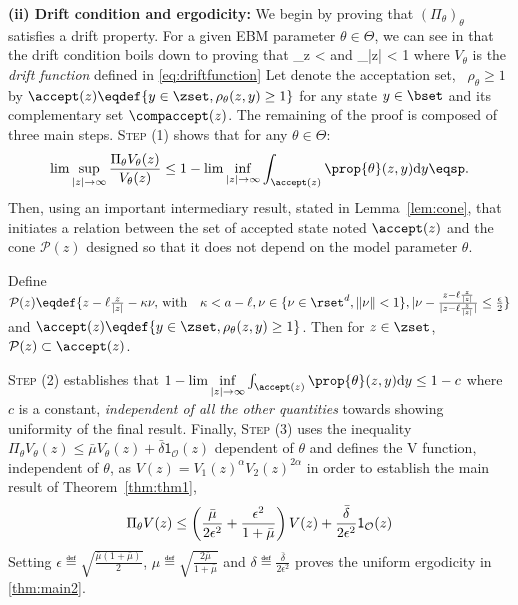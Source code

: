 \documentclass[10pt,twocolumn,letterpaper]{article}
\begin{document}
\medskip
\noindent \textbf{(ii) Drift condition and ergodicity: }
We begin by proving that $(\Pi_\theta)_\theta$ satisfies a drift property.
For a given EBM parameter $\theta \in \Theta$, we can see in \cite{jarner2000geometric} that the drift condition boils down to proving that
\beq\notag
\sup \limits_{z \in \zset}   < \infty \quad \textrm{and} \quad \lim \sup \limits_{|z| \to \infty}   < 1
\eeq
where $V_\theta$ is the \emph{drift function} defined in \eqref{eq:driftfunction}
Let denote the acceptation set, \ie\ $\rho_\theta \geq 1$ by $\accept(z) \eqdef \{ y \in \zset, \rho_\theta(z,y) \geq 1 \}$ for any state $y \in \bset$ and its complementary set $\compaccept(z)$.
The remaining of the proof is composed of three main steps. \textsc{Step (1)} shows that for any $\theta \in \Theta$:
\begin{align}\notag
\lim \sup \limits_{|z| \to \infty}  \frac{\Pi_\theta V_\theta(z)}{V_\theta(z)} \leq 1 - \lim \inf \limits_{|z| \to \infty}  \int_{\accept(z)} \prop{\theta}(z,y)  \textrm{d}y \eqsp.
\end{align}
Then, using an important intermediary result, stated in Lemma~\ref{lem:cone}, that initiates a relation between the set of accepted state noted $\accept(z)$ and the cone $\mathcal{P}(z)$ designed so that it does not depend on the model parameter $\theta$. 
\begin{lemm}\label{lem:cone}
Define $\mathcal{P}(z) \eqdef \{ z- \ell \frac{z}{|z|} - \kappa \nu , \, \textrm{with} \quad \kappa < a - \ell  , \nu \in \{ \nu \in \rset^d, \| \nu \| < 1\}, |\nu - \frac{z- \ell \frac{z}{|z|} }{|z- \ell \frac{z}{|z|} |} \leq \frac{\epsilon}{2}   \}$ and $\accept(z) \eqdef \{ y \in \zset, \rho_\theta(z,y) \geq 1 \}$. Then for $z \in \zset$, $\mathcal{P}(z) \subset \accept(z)$.
\end{lemm}
\textsc{Step (2)} establishes that $1 - \lim \inf \limits_{|z| \to \infty}  \int_{\accept(z)} \prop{\theta}(z,y)  \textrm{d}y \leq 1 - c$ where $c$ is a constant, \emph{independent of all the other quantities} towards showing uniformity of the final result.
Finally, \textsc{Step (3)} uses the inequality $\Pi_\theta V_\theta(z) \leq \bar{\mu} V_\theta(z) + \bar{\delta} \mathsf{1}_{\mathcal{O}}(z)$ dependent of $\theta$ and defines the V function, independent of $\theta$, as $V(z) = V_1(z)^\alpha V_2(z)^{2\alpha}$ in order to establish the main result of Theorem~\ref{thm:thm1}, \ie
\begin{align}\notag
\Pi_\theta V(z) \leq \left(\frac{\bar{\mu}}{2 \epsilon^2} + \frac{\epsilon^2}{1 + \bar{\mu}} \right) V(z) +\frac{\bar{\delta}}{2 \epsilon^2} \mathsf{1}_{\mathcal{O}}(z) 
\end{align}
Setting $\epsilon \eqdef \sqrt{\frac{\bar{\mu}(1+\bar{\mu})}{2}}$, $ \mu  \eqdef  \sqrt{\frac{2\bar{\mu}}{1+\bar{\mu}}}$ and $\delta \eqdef \frac{\bar{\delta}}{2 \epsilon^2}$ proves the uniform ergodicity in \eqref{thm:main2}.
\end{document}
